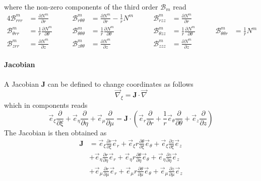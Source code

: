 \documentclass[times,namecite]{goose-article}
\begin{document}
where the non-zero components of the third order $\mathcal{B}_m$ read
\begin{alignat}{4}
  \mathcal{B}^{m}_{r      r      r     } &= \frac{\partial N^m}{\partial r} & \qquad
  \mathcal{B}^{m}_{r      \theta \theta} &= \frac{\partial N^m}{\partial r} - \frac{1}{r} N^m & \qquad
  \mathcal{B}^{m}_{r      z      z     } &= \frac{\partial N^m}{\partial r}
  \nonumber
  \\
  \mathcal{B}^{m}_{\theta r      r     } &= \frac{1}{r} \frac{\partial N^m}{\partial \theta} & \qquad
  \mathcal{B}^{m}_{\theta \theta \theta} &= \frac{1}{r} \frac{\partial N^m}{\partial \theta} & \qquad
  \mathcal{B}^{m}_{\theta z      z     } &= \frac{1}{r} \frac{\partial N^m}{\partial \theta} & \qquad
  \mathcal{B}^{m}_{\theta \theta r     } &= \frac{1}{r} N^m
  \nonumber
  \\
  \mathcal{B}^{m}_{z      r      r     } &= \frac{\partial N^m}{\partial z} & \qquad
  \mathcal{B}^{m}_{z      \theta \theta} &= \frac{\partial N^m}{\partial z} & \qquad
  \mathcal{B}^{m}_{z      z      z     } &= \frac{\partial N^m}{\partial z}
\end{alignat}

\paragraph{Jacobian}

A Jacobian $\bm{J}$ can be defined to change coordinates as follows
\begin{equation}
  \vec{\nabla}_\xi = \bm{J} \cdot \vec{\nabla}
\end{equation}
which in components reads
\begin{equation}
  \vec{e}_\xi  \frac{\partial}{\partial \xi }  +
  \vec{e}_\eta \frac{\partial}{\partial \eta} +
  \vec{e}_\mu  \frac{\partial}{\partial \mu}
  =
  \bm{J} \cdot
  \left(
              \vec{e}_r      \frac{\partial}{\partial r     } +
  \frac{1}{r} \vec{e}_\theta \frac{\partial}{\partial \theta} +
              \vec{e}_z      \frac{\partial}{\partial z     }
  \right)
\end{equation}
The Jacobian is then obtained as
\begin{align}
  \bm{J}
  &=
  \vec{e}_\xi    \frac{\partial r     }{\partial \xi } \vec{e}_r      +
  \vec{e}_\xi  r \frac{\partial \theta}{\partial \xi } \vec{e}_\theta +
  \vec{e}_\xi    \frac{\partial z     }{\partial \xi } \vec{e}_z
  \nonumber
  \\
  &+
  \vec{e}_\eta   \frac{\partial r     }{\partial \eta} \vec{e}_r      +
  \vec{e}_\eta r \frac{\partial \theta}{\partial \eta} \vec{e}_\theta +
  \vec{e}_\eta   \frac{\partial z     }{\partial \eta} \vec{e}_z
  \nonumber
  \\
  &+
  \vec{e}_\mu    \frac{\partial r     }{\partial \mu } \vec{e}_r      +
  \vec{e}_\mu  r \frac{\partial \theta}{\partial \mu } \vec{e}_\theta +
  \vec{e}_\mu    \frac{\partial z     }{\partial \mu } \vec{e}_z
\end{align}
\end{document}
